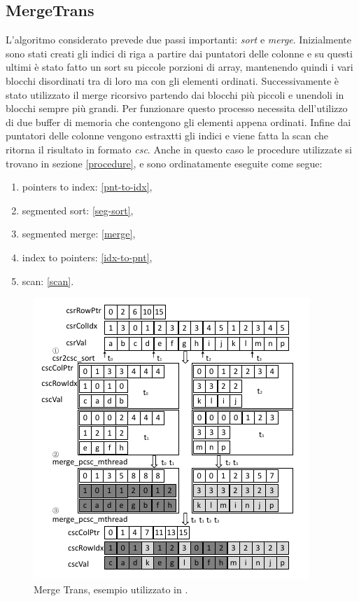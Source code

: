 \documentclass[]{IEEEtran}
\begin{document}
	\subsection{MergeTrans}
	L'algoritmo considerato prevede due passi importanti: \textit{sort} e \textit{merge}.
	Inizialmente sono stati creati gli indici di riga a partire dai puntatori delle colonne e su questi ultimi è stato fatto un sort su piccole porzioni di array, mantenendo quindi i vari blocchi disordinati tra di loro ma con gli elementi ordinati. Successivamente è stato utilizzato il merge ricorsivo partendo dai blocchi più piccoli e unendoli in blocchi sempre più grandi. Per funzionare questo processo necessita dell'utilizzo di due buffer di memoria che contengono gli elementi appena ordinati. Infine dai puntatori delle colonne vengono estraxtti gli indici e viene fatta la scan che ritorna il risultato in formato \textit{csc}. \newline
	Anche in questo caso le procedure utilizzate si trovano in sezione \ref{procedure}, e sono ordinatamente eseguite come segue:
	\begin{enumerate}
		\item pointers to index: \ref{pnt-to-idx},
		\item segmented sort: \ref{seg-sort},
		\item segmented merge: \ref{merge},
		\item index to pointers: \ref{idx-to-pnt},
		\item scan: \ref{scan}.
	\end{enumerate}
	
	\begin{figure}[H]
		\includegraphics[scale=0.6]{mergetrans.png}
		\caption{Merge Trans, esempio utilizzato in \cite{parallelTrans}.}
		\label{mergetrans}
	\end{figure}
	
\end{document}
